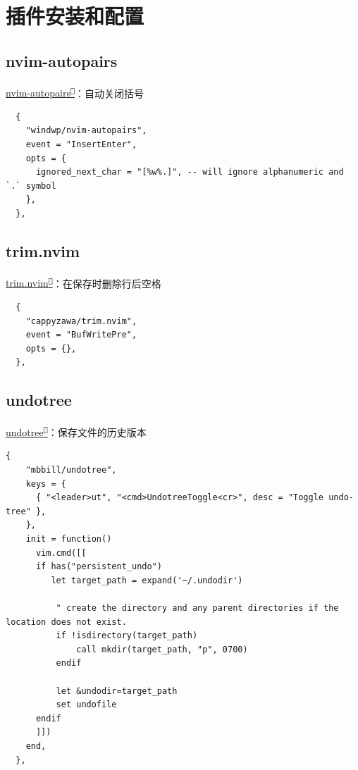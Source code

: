 \documentclass[aspectratio=169]{ctexbeamer}
\newcommand{\nerd}[1]{\texttt{#1}}
\newcommand{\link}[3][]{\href{#3}{#2\textsuperscript{\nerd{}}}}
\begin{document}
\section{插件安装和配置}

  \subsection{nvim-autopairs}
    \begin{frame}[fragile]{\link{nvim-autopairs}{https://github.com/windwp/nvim-autopairs}：自动关闭括号}

      \begin{lstlisting}
  {
    "windwp/nvim-autopairs",
    event = "InsertEnter",
    opts = {
      ignored_next_char = "[%w%.]", -- will ignore alphanumeric and `.` symbol
    },
  },
      \end{lstlisting}
    \end{frame}

  \subsection{trim.nvim}
    \begin{frame}[fragile]{\link{trim.nvim}{https://github.com/cappyzawa/trim.nvim}：在保存时删除行后空格}

      \begin{lstlisting}
  {
    "cappyzawa/trim.nvim",
    event = "BufWritePre",
    opts = {},
  },
      \end{lstlisting}

    \end{frame}

  \subsection{undotree}
    \begin{frame}[fragile]{\link{undotree}{https://github.com/jiaoshijie/undotree}：保存文件的历史版本}

      \begin{lstlisting}[basicstyle=\tiny\ttfamily]
  {
    "mbbill/undotree",
    keys = {
      { "<leader>ut", "<cmd>UndotreeToggle<cr>", desc = "Toggle undo-tree" },
    },
    init = function()
      vim.cmd([[
      if has("persistent_undo")
         let target_path = expand('~/.undodir')

          " create the directory and any parent directories if the location does not exist.
          if !isdirectory(target_path)
              call mkdir(target_path, "p", 0700)
          endif

          let &undodir=target_path
          set undofile
      endif
      ]])
    end,
  },
      \end{lstlisting}
    \end{frame}
\end{document}
